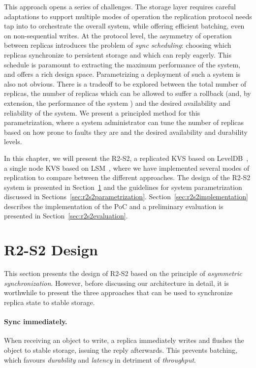 This approach opens a series of challenges. The storage layer
requires careful adaptations to support multiple modes of
operation the replication protocol needs tap into to orchestrate
the overall system, while offering efficient batching, even on
non-sequential writes. At the protocol level, the asymmetry of
operation between replicas introduces the problem of \emph{sync
scheduling}: choosing which replicas synchronize to persistent storage
and which can reply eagerly. This schedule is paramount to
extracting the maximum performance of the system, and offers a
rich design space. Parametrizing a deployment of such a system is
also not obvious. There is a tradeoff to be explored between the
total number of replicas, the number of replicas which can be
allowed to suffer a rollback (and, by extension, the performance
of the system ) and the desired
availability and reliability of the system. We present a
principled method for this parametrization, where a system
administrator can tune the number of replicas based on how prone
to faults they are and the desired availability and durability
levels.

In this chapter, we will present the \acf{R2-S2}, a replicated
\ac{KVS} based on LevelDB~\cite{leveldb}, a single node \ac{KVS}
based on \ac{LSM}~\cite{lsm}, where we have implemented several modes
of replication to compare between the different approaches. The
design of the \ac{R2-S2} system is presented in
Section~\ref{sec:r2s2design} and the guidelines for system
parametrization discussed in
Sections~\ref{sec:r2s2parametrization}.
Section~\ref{sec:r2s2implementation} describes the implementation
of the PoC and a preliminary evaluation is presented in
Section~\ref{sec:r2s2evaluation}.

\section{\ac{R2-S2} Design}\label{sec:r2s2design}

This section presents the design of \ac{R2-S2}
based on the principle of \emph{asymmetric synchronization}. However,
before discussing our architecture in detail, it is worthwhile to
present the three approaches that can be used to synchronize
replica state to stable storage.

\paragraph{Sync immediately.} When receiving an object to write, a
replica immediately writes and flushes the object to stable
storage, issuing the reply afterwards. This prevents batching,
which favours \emph{durability} and \emph{latency} in detriment
of \emph{throughput}.

